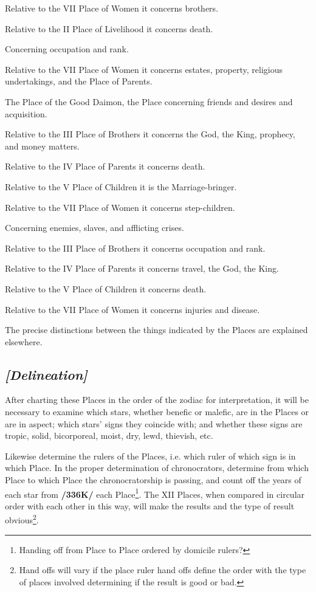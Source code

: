\begin{description}[labelindent=0em , labelwidth=1em, labelsep=1em, leftmargin =!]
	 Relative to the VII Place of Women it concerns brothers. 
	 
	 Relative to the II Place of Livelihood it concerns death.
	 
\item[X.] 
	Concerning occupation and rank. 
	
	Relative to the VII Place of Women it concerns estates, property, religious undertakings, and the Place of Parents.
	
\item[XI.] 
	The Place of the Good Daimon, the Place concerning friends and desires and acquisition. 
	
	Relative to the III Place of Brothers it concerns the God, the King, prophecy, and money matters. 
	
	Relative to the IV Place of Parents it concerns death. 
	
	Relative to the V Place of Children it is the Marriage-bringer. 
	
	Relative to the VII Place of Women it concerns step-children.
	
\item[XII.] 
	 Concerning enemies, slaves, and afflicting crises. 
	 
	 Relative to the III Place of Brothers it concerns occupation and rank. 
	 
	 Relative to the IV Place of Parents it concerns travel, the God, the King. 
	 
	 Relative to the V Place of Children it concerns death. 
	 
	 Relative to the VII Place of Women it concerns injuries and disease.
\end{description}


The precise distinctions between the things indicated by the Places are explained elsewhere. 

\subsection{\textit{[Delineation]}}
After charting these Places in the order of the zodiac for interpretation, it will be necessary to examine which stars, whether benefic or malefic, are in the Places or are in aspect; which stars’ signs they coincide with; and whether these signs are tropic, solid, bicorporeal, moist, dry, lewd, thievish, etc. 

Likewise determine the rulers of the Places, i.e. which ruler of which sign is in which Place. In the proper determination of chronocrators, determine from which Place to which Place the chronocratorship is passing, and count off the years of each star from \textbf{/336K/} each Place\footnote{Handing off from Place to Place ordered by domicile rulers?}. The XII Places, when compared in circular order with each other in this way, will make the results and the type of result obvious\footnote{Hand offs will vary if the place ruler hand offs define the order with the type of places involved determining if the result is good or bad.}.

